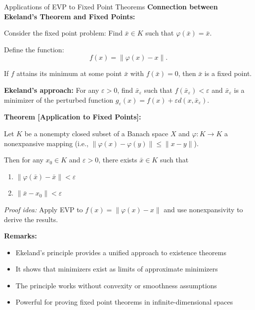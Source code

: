 \documentclass[aspectratio=169,10pt]{beamer}
\begin{document}
\begin{frame}[allowframebreaks]{Applications of EVP to Fixed Point Theorems}
  \textbf{Connection between Ekeland's Theorem and Fixed Points:}

  Consider the fixed point problem: Find $\bar{x} \in K$ such that $\varphi(\bar{x}) = \bar{x}$.

  Define the function:
  \[
  f(x) = \|\varphi(x) - x\|.
  \]

  If $f$ attains its minimum at some point $\bar{x}$ with $f(\bar{x}) = 0$, then $\bar{x}$ is a fixed point.

  \vspace{0.5cm}

  \textbf{Ekeland's approach:} For any $\varepsilon > 0$, find $\bar{x}_\varepsilon$ such that $f(\bar{x}_\varepsilon) < \varepsilon$ and $\bar{x}_\varepsilon$ is a minimizer of the perturbed function $g_\varepsilon(x) = f(x) + \varepsilon d(x, \bar{x}_\varepsilon)$.

  \framebreak

  \textbf{Theorem [Application to Fixed Points]:}

  Let $K$ be a nonempty closed subset of a Banach space $X$ and $\varphi: K \to K$ a nonexpansive mapping (i.e., $\|\varphi(x) - \varphi(y)\| \leq \|x - y\|$).

  Then for any $x_0 \in K$ and $\varepsilon > 0$, there exists $\bar{x} \in K$ such that
  \begin{enumerate}
    \item $\|\varphi(\bar{x}) - \bar{x}\| < \varepsilon$
    \item $\|\bar{x} - x_0\| < \varepsilon$
  \end{enumerate}

  \vspace{0.3cm}
  \textit{Proof idea:} Apply EVP to $f(x) = \|\varphi(x) - x\|$ and use nonexpansivity to derive the results.

  \framebreak

  \textbf{Remarks:}
  \begin{itemize}
    \item Ekeland's principle provides a unified approach to existence theorems
    \item It shows that minimizers exist as limits of approximate minimizers
    \item The principle works without convexity or smoothness assumptions
    \item Powerful for proving fixed point theorems in infinite-dimensional spaces
  \end{itemize}
\end{frame}
\end{document}
